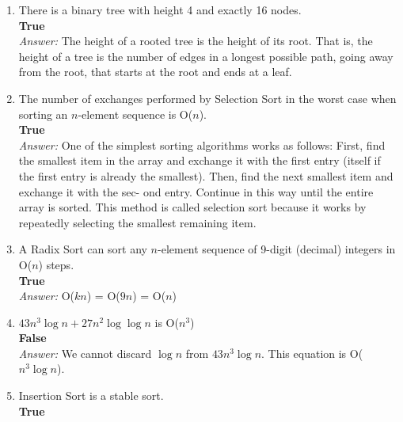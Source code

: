 \documentclass[a4paper]{article}
\newcommand{\ans}{\textit{Answer: }}
\begin{document}
\begin{enumerate}
  \item There is a binary tree with height 4 and exactly 16 nodes. \\ 
  \textbf{True} \\
  \ans The height of a rooted tree is the height of its root. That is, the height of a tree is the number of edges in a longest possible path, going away from the root, that starts at the root and ends at a leaf.

  \item The number of exchanges performed by Selection Sort in the worst case when sorting an $n$-element sequence is O($n$). \\
  \textbf{True} \\
  \ans One of the simplest sorting algorithms works as follows: First, find the smallest item in the array and exchange it with the first entry (itself if the first entry is already the smallest). Then, find the next smallest item and exchange it with the sec- ond entry. Continue in this way until the entire array is sorted. This method is called selection sort because it works by repeatedly selecting the smallest remaining item.

  \item A Radix Sort can sort any $n$-element sequence of 9-digit (decimal) integers in O($n$) steps. \\ 
  \textbf{True} \\
  \ans O($kn$) = O($9n$) = O($n$)

  \item  $43n^3\log n + 27n^2 \log \log n$ is O($n^3$) \\
  \textbf{False} \\
  \ans We cannot discard $\log n$ from $43n^3\log n$. This equation is O($n^3\log n$).

  \item Insertion Sort is a stable sort. \\
  \textbf{True} \\

\end{enumerate}
\end{document}
